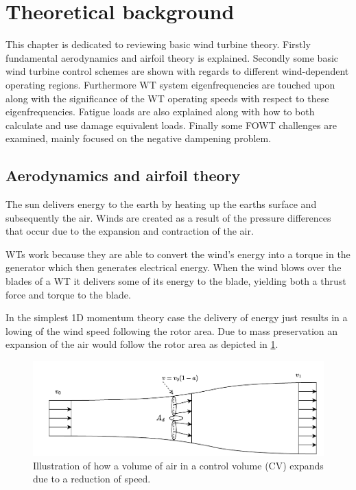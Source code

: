 \section{Theoretical background} \label{sec:theory}
This chapter is dedicated to reviewing basic wind turbine theory. Firstly fundamental aerodynamics and airfoil theory is explained. Secondly some basic wind turbine control schemes are shown with regards to different wind-dependent operating regions. Furthermore WT system eigenfrequencies are touched upon along with the significance of the WT operating speeds with respect to these eigenfrequencies. Fatigue loads are also explained along with how to both calculate and use damage equivalent loads. Finally some FOWT challenges are examined, mainly focused on the negative dampening problem.

\subsection{Aerodynamics and airfoil theory} \label{sec:theory_aero}
The sun delivers energy to the earth by heating up the earths surface and subsequently the air. Winds are created as a result of the pressure differences that occur due to the expansion and contraction of the air. 

WTs work because they are able to convert the wind's energy into a torque in the generator which then generates electrical energy. When the wind blows over the blades of a WT it delivers some of its energy to the blade, yielding both a thrust force and torque to the blade.

In the simplest 1D momentum theory case the delivery of energy just results in a lowing of the wind speed following the rotor area. Due to mass preservation an expansion of the air would follow the rotor area as depicted in \cref{fig:betz}.
\begin{figure}[ht]
	\centering
	\includegraphics[width=0.8\linewidth]{Graphics/FlowThroughRotor.pdf}
	\caption{Illustration of how a volume of air in a control volume (CV) expands due to a reduction of speed.}
	\label{fig:betz}
\end{figure}

